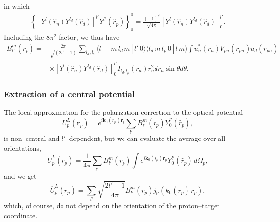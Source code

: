 \documentclass[a4paper,11pt]{article}
\begin{document}
 in which
 \begin{align}\label{eq78}
  \left\{\left[Y^{l}(\hat r_n)Y^{l_d}(\hat r_d)\right]^{l'}Y^{l'}(\hat r_p)\right\}^0_0=\frac{(-1)^{l'}}{\sqrt{4\pi}}\left[Y^{l}(\hat r_n)Y^{l_d}(\hat r_d)\right]^{l'}_0.
 \end{align}
 Including the $8\pi^2$ factor, we thus have 
  \begin{align}\label{eq56}
  \nonumber B^m_{l'}(r_p)=&\frac{2\pi}{\sqrt{(2l'+1)}}\sum_{l_d,l_p}\langle l\,-m\,l_d\,m\,|\,l'\,0\rangle\langle l_d\,m\,l_p\,0\,|\,l\,m\rangle\int u_n^*(r_n)V_{pn}(r_{pn})u_d(r_{pn})\\
  &\times  \left[Y^{l}(\hat r_n)Y^{l_d}(\hat r_d)\right]^{l'}_0 I_{l_d,l_p}(r_d)r^2_n d r_n \sin\theta d\theta.
  \end{align}
  \subsubsection{Extraction of a central potential}
The local approximation for the polarization correction to the optical potential 
 \begin{equation}\label{eq58}
U^L_p(\mathbf r_p)=e^{i\mathbf k_0(r_p)\mathbf r_p}\sum_{l'} B^m_{l'}(r_p)Y_0^{l'}(\hat r_p),
 \end{equation}
is non--central and $l'$--dependent, but we can evaluate the average over all orientations,
 \begin{equation}\label{eq50}
\overline U^L_p(r_p)=\frac{1}{4\pi}\sum_{l'} B^m_{l'}(r_p)\int e^{i\mathbf k_0(r_p)\mathbf r_p}Y_0^{l'}(\hat r_p)\,d\Omega_p,
 \end{equation}
 and we get
 \begin{equation}\label{eq70}
 \overline U^L_p(r_p)=\sum_{l'}\sqrt{\frac{2l'+1}{4\pi}} B^m_{l'}(r_p)j_{l'}(k_0(r_p) \,r_p),
 \end{equation}
 which, of course, do not depend on the orientation of the proton--target coordinate.
\end{document}

